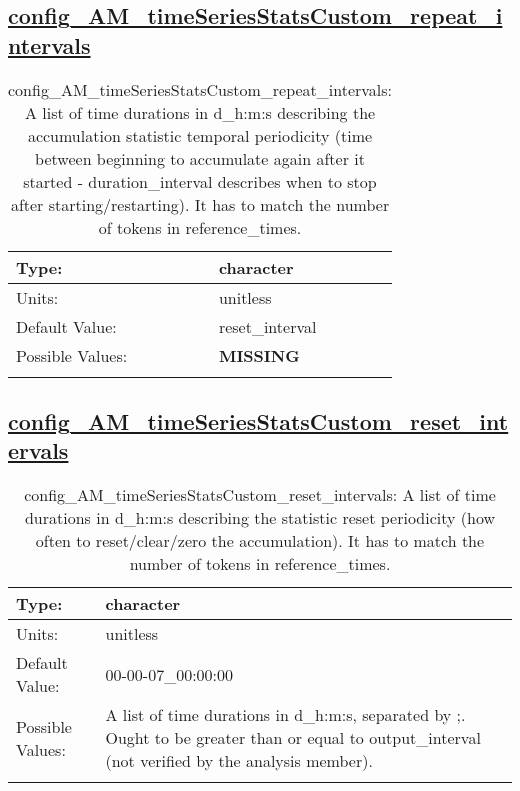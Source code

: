 \subsection[config\_AM\_timeSeriesStatsCustom\_repeat\_intervals]{\hyperref[sec:nm_tab_AM_timeSeriesStatsCustom]{config\_AM\_timeSeriesStatsCustom\_repeat\_intervals}}
\label{subsec:nm_sec_config_AM_timeSeriesStatsCustom_repeat_intervals}
\begin{center}
\begin{longtable}{| p{2.0in} || p{4.0in} |}
    \hline
    Type: & character \\
    \hline
    Units: & \si{unitless} \\
    \hline
    Default Value: & reset\_interval \\
    \hline
    Possible Values: & {\bf \color{red} MISSING} \\
    \hline
    \caption{config\_AM\_timeSeriesStatsCustom\_repeat\_intervals: A list of time durations in d\_h:m:s describing the accumulation statistic temporal periodicity (time between beginning to accumulate again after it started - duration\_interval describes when to stop after starting/restarting). It has to match the number of tokens in reference\_times.}
\end{longtable}
\end{center}
\subsection[config\_AM\_timeSeriesStatsCustom\_reset\_intervals]{\hyperref[sec:nm_tab_AM_timeSeriesStatsCustom]{config\_AM\_timeSeriesStatsCustom\_reset\_intervals}}
\label{subsec:nm_sec_config_AM_timeSeriesStatsCustom_reset_intervals}
\begin{center}
\begin{longtable}{| p{2.0in} || p{4.0in} |}
    \hline
    Type: & character \\
    \hline
    Units: & \si{unitless} \\
    \hline
    Default Value: & 00-00-07\_00:00:00 \\
    \hline
    Possible Values: & A list of time durations in d\_h:m:s, separated by ;. Ought to be greater than or equal to output\_interval (not verified by the analysis member). \\
    \hline
    \caption{config\_AM\_timeSeriesStatsCustom\_reset\_intervals: A list of time durations in d\_h:m:s describing the statistic reset periodicity (how often to reset/clear/zero the accumulation). It has to match the number of tokens in reference\_times.}
\end{longtable}
\end{center}
